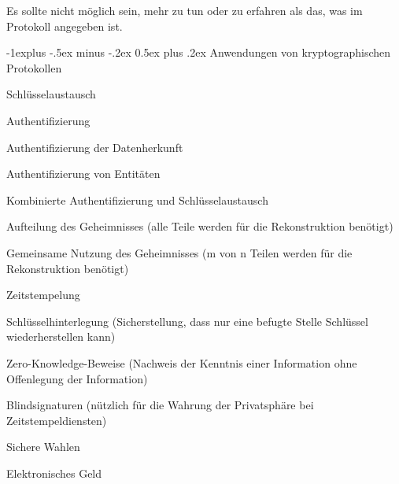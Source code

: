 \documentclass[a4paper]{article}
\makeatletter
\renewcommand{\subsection}{\@startsection{subsection}{2}{0mm}%
 {-1explus -.5ex minus -.2ex}%
 {0.5ex plus .2ex}%
 {\normalfont\normalsize\bfseries}}
\makeatother
\begin{document}
\begin{multicols}{3}
\begin{itemize*}
            \begin{itemize*}
                  \item Es sollte nicht möglich sein, mehr zu tun oder zu erfahren als das, was im Protokoll angegeben ist.
            \end{itemize*}
      \end{itemize*}


      \subsection{Anwendungen von kryptographischen
            Protokollen}

      \begin{itemize*}
            \item
            Schlüsselaustausch
            \item
            Authentifizierung

            \begin{itemize*}
                  \item Authentifizierung der Datenherkunft
                  \item Authentifizierung von Entitäten
            \end{itemize*}
            \item
            Kombinierte Authentifizierung und Schlüsselaustausch
            \item
            Aufteilung des Geheimnisses (alle Teile werden für die Rekonstruktion
            benötigt)
            \item
            Gemeinsame Nutzung des Geheimnisses (m von n Teilen werden für die
            Rekonstruktion benötigt)
            \item
            Zeitstempelung
            \item
            Schlüsselhinterlegung (Sicherstellung, dass nur eine befugte Stelle
            Schlüssel wiederherstellen kann)
            \item
            Zero-Knowledge-Beweise (Nachweis der Kenntnis einer Information ohne
            Offenlegung der Information)
            \item
            Blindsignaturen (nützlich für die Wahrung der Privatsphäre bei
            Zeitstempeldiensten)
            \item
            Sichere Wahlen
            \item
            Elektronisches Geld
      \end{itemize*}



\end{multicols}
\end{document}
